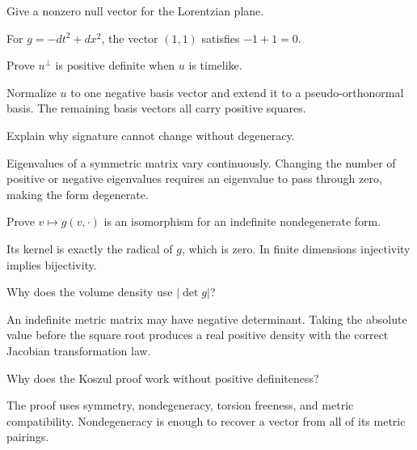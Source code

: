 \begin{problem}\label{prob:vii29-02}
Give a nonzero null vector for the Lorentzian plane.
\end{problem}
\begin{solution}
For \(g=-dt^2+dx^2\), the vector \((1,1)\) satisfies \(-1+1=0\).
\end{solution}

\begin{problem}\label{prob:vii29-03}
Prove \(u^\perp\) is positive definite when \(u\) is timelike.
\end{problem}
\begin{solution}
Normalize \(u\) to one negative basis vector and extend it to a pseudo-orthonormal basis. The remaining basis vectors all carry positive squares.
\end{solution}

\begin{problem}\label{prob:vii29-04}
Explain why signature cannot change without degeneracy.
\end{problem}
\begin{solution}
Eigenvalues of a symmetric matrix vary continuously. Changing the number of positive or negative eigenvalues requires an eigenvalue to pass through zero, making the form degenerate.
\end{solution}

\begin{problem}\label{prob:vii29-05}
Prove \(v\mapsto g(v,\cdot)\) is an isomorphism for an indefinite nondegenerate form.
\end{problem}
\begin{solution}
Its kernel is exactly the radical of \(g\), which is zero. In finite dimensions injectivity implies bijectivity.
\end{solution}

\begin{problem}\label{prob:vii29-06}
Why does the volume density use \(|\det g|\)?
\end{problem}
\begin{solution}
An indefinite metric matrix may have negative determinant. Taking the absolute value before the square root produces a real positive density with the correct Jacobian transformation law.
\end{solution}

\begin{problem}\label{prob:vii29-07}
Why does the Koszul proof work without positive definiteness?
\end{problem}
\begin{solution}
The proof uses symmetry, nondegeneracy, torsion freeness, and metric compatibility. Nondegeneracy is enough to recover a vector from all of its metric pairings.
\end{solution}

